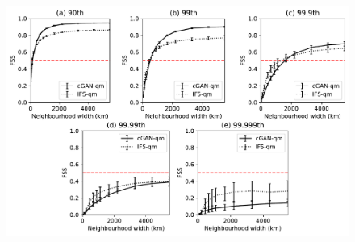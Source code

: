 \documentclass{article}
\begin{document}
\begin{figure}
     \centering
     \includegraphics[width=\textwidth]{images/fss_final-nologs-mam2018_217600_kenya.pdf}
     
     \caption{
     }
     \label{fig:fss_extreme}
\end{figure}


\end{document}
